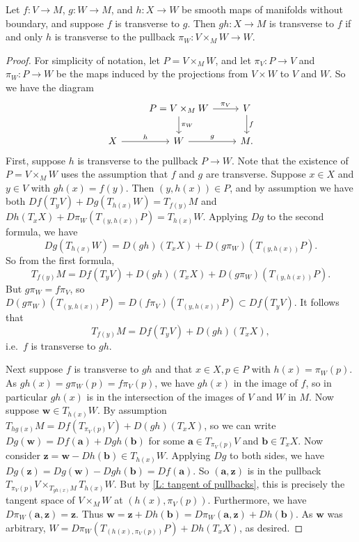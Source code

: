 \begin{lemma}\label{L: transverse to pullback}
	Let $f \colon V \to M$, $g \colon W \to M$, and $h \colon X \to W$ be smooth maps of manifolds without boundary, and suppose $f$ is transverse to $g$.
	Then $gh \colon X \to M$ is transverse to $f$ if and only $h$ is transverse to the pullback $\pi_W \colon V \times_M W \to W$.
\end{lemma}

\begin{proof}
	For simplicity of notation, let $P = V \times_MW$, and let $\pi_V \colon P \to V$ and $\pi_W \colon P \to W$ be the maps induced by the projections from $V \times W$ to $V$ and $W$.
	So we have the diagram
	\[
	\begin{tikzcd}
		& P = V \times_M W \arrow[r, "\pi_V"] \arrow[d, "\pi_W"] & V \arrow[d, "f"] \\
		X \arrow[r, "h"] & W \arrow[r, "g"]&  M.
	\end{tikzcd}
	\]
	First, suppose $h$ is transverse to the pullback $P \to W$.
	Note that the existence of $P = V \times_M W$ uses the assumption that $f$ and $g$ are transverse.
	Suppose $x \in X$ and $y \in V$ with $gh(x) = f(y)$.
	Then $(y,h(x)) \in P$, and by assumption we have both $Df(T_yV)+Dg(T_{h(x)}W) = T_{f(y)}M$ and
	$Dh(T_xX)+D\pi_W(T_{(y,h(x))}P) = T_{h(x)}W$.
	Applying $Dg$ to the second formula, we have
	$$Dg(T_{h(x)}W) = D(gh)(T_xX)+D(g\pi_W)(T_{(y,h(x))}P).$$
	So from the first formula,
	$$T_{f(y)}M = Df(T_yV)+D(gh)(T_xX)+D(g\pi_W)(T_{(y,h(x))}P).$$
	But $g\pi_W = f\pi_V$, so $D(g\pi_W)(T_{(y,h(x))}P) = D(f\pi_V)(T_{(y,h(x))}P) \subset Df(T_yV)$.
	It follows that
	$$T_{f(y)}M = Df(T_yV)+D(gh)(T_xX),$$
	i.e.\ $f$ is transverse to $gh$.

	Next suppose $f$ is transverse to $gh$ and that $x \in X, p \in P$ with $h(x) = \pi_W(p)$.
	As $gh(x) = g\pi_W(p) = f\pi_V(p)$, we have $gh(x)$ in the image of $f$, so in particular $gh(x)$ is in the intersection of the images of $V$ and $W$ in $M$.
	Now suppose $\mathbf w \in T_{h(x)}W$.
	By assumption $T_{hg(x)}M = Df(T_{\pi_V(p)}V)+D(gh)(T_xX)$, so we can write $Dg(\mathbf w) = Df(\mathbf a)+Dgh(\mathbf b)$ for some $\mathbf a \in T_{\pi_V(p)}V$ and $\mathbf b \in T_x X$.
	Now consider $\mathbf z = \mathbf w-Dh(\mathbf b) \in T_{h(x)}W$.
	Applying $Dg$ to both sides, we have $Dg(\mathbf z) = Dg(\mathbf w)-Dgh(\mathbf b) = Df(\mathbf a)$.
	So $(\mathbf a,\mathbf z)$ is in the pullback $T_{\pi_V(p)}V \times_{T_{gh(x)}M} T_{h(x)}W$.
	But by \cref{L: tangent of pullbacks}, this is precisely the tangent space of $V \times_MW$ at $(h(x),\pi_V(p))$.
	Furthermore, we have $D\pi_W(\mathbf a,\mathbf z) = \mathbf z$.
	Thus $\mathbf w = \mathbf z+Dh(\mathbf b) = D\pi_W(\mathbf a,\mathbf z)+Dh(\mathbf b)$.
	As $\mathbf w$ was arbitrary, $W = D\pi_W(T_{(h(x),\pi_V(p))}P)+Dh(T_xX)$, as desired.
\end{proof}

